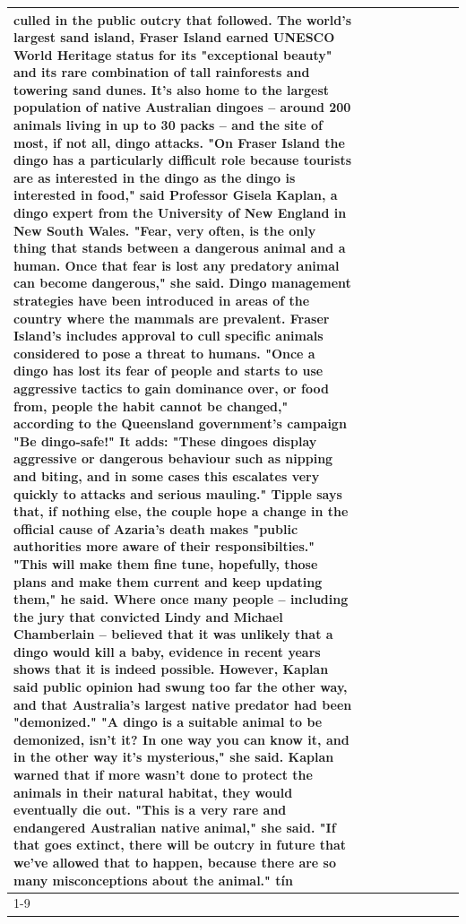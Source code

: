 \begin{table}[H]
\begin{tabular}{lllrlllll}
culled in the public outcry that followed. The world's largest sand island, Fraser Island earned UNESCO World Heritage status for its "exceptional beauty" and its rare combination of tall rainforests and towering sand dunes. It's also home to the largest population of native Australian dingoes -- around 200 animals living in up to 30 packs -- and the site of most, if not all, dingo attacks. "On Fraser Island the dingo has a particularly difficult role because tourists are as interested in the dingo as the dingo is interested in food," said Professor Gisela Kaplan, a dingo expert from the University of New England in New South Wales. "Fear, very often, is the only thing that stands between a dangerous animal and a human. Once that fear is lost any predatory animal can become dangerous," she said. Dingo management strategies have been introduced in areas of the country where the mammals are prevalent. Fraser Island's includes approval to cull specific animals considered to pose a threat to humans. "Once a dingo has lost its fear of people and starts to use aggressive tactics to gain dominance over, or food from, people the habit cannot be changed," according to the Queensland government's campaign "Be dingo-safe!" It adds: "These dingoes display aggressive or dangerous behaviour such as nipping and biting, and in some cases this escalates very quickly to attacks and serious mauling." Tipple says that, if nothing else, the couple hope a change in the official cause of Azaria's death makes "public authorities more aware of their responsibilties." "This will make them fine tune, hopefully, those plans and make them current and keep updating them," he said. Where once many people -- including the jury that convicted Lindy and Michael Chamberlain -- believed that it was unlikely that a dingo would kill a baby, evidence in recent years shows that it is indeed possible. However, Kaplan said public opinion had swung too far the other way, and that Australia's largest native predator had been "demonized." "A dingo is a suitable animal to be demonized, isn't it? In one way you can know it, and in the other way it's mysterious," she said. Kaplan warned that if more wasn't done to protect the animals in their natural habitat, they would eventually die out. "This is a very rare and endangered Australian native animal," she said. "If that goes extinct, there will be outcry in future that we've allowed that to happen, because there are so many misconceptions about the animal." tín \\
\cline{1-9}

\end{tabular}
\end{table}
